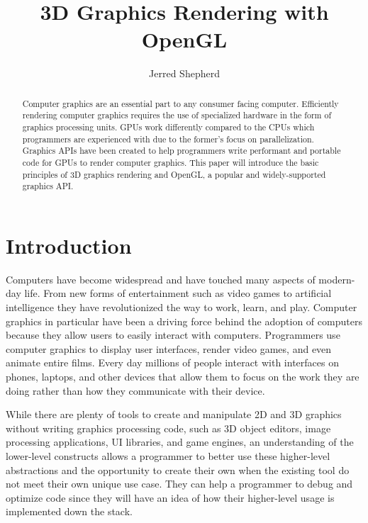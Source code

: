 \documentclass{article}
\title{\Large\textbf{3D Graphics Rendering with OpenGL}}
\author{Jerred Shepherd}
\begin{document}
\begin{titlingpage}
    \maketitle
    \begin{abstract}
    Computer graphics are an essential part to any consumer facing computer. Efficiently rendering computer graphics requires the use of specialized hardware in the form of graphics processing units. GPUs work differently compared to the CPUs which programmers are experienced with due to the former's focus on parallelization. Graphics APIs have been created to help programmers write performant and portable code for GPUs to render computer graphics. This paper will introduce the basic principles of 3D graphics rendering and OpenGL, a popular and widely-supported graphics API.
    \end{abstract}
\end{titlingpage}

\section{Introduction}
Computers have become widespread and have touched many aspects of modern-day life. From new forms of entertainment such as video games to artificial intelligence they have revolutionized the way to work, learn, and play. Computer graphics in particular have been a driving force behind the adoption of computers because they allow users to easily interact with computers. Programmers use computer graphics to display user interfaces, render video games, and even animate entire films. Every day millions of people interact with interfaces on phones, laptops, and other devices that allow them to focus on the work they are doing rather than how they communicate with their device. %

While there are plenty of tools to create and manipulate 2D and 3D graphics without writing graphics processing code, such as 3D object editors, image processing applications, UI libraries, and game engines, an understanding of the lower-level constructs allows a programmer to better use these higher-level abstractions and the opportunity to create their own when the existing tool do not meet their own unique use case. They can help a programmer to debug and optimize code since they will have an idea of how their higher-level usage is implemented down the stack.
\end{document}
